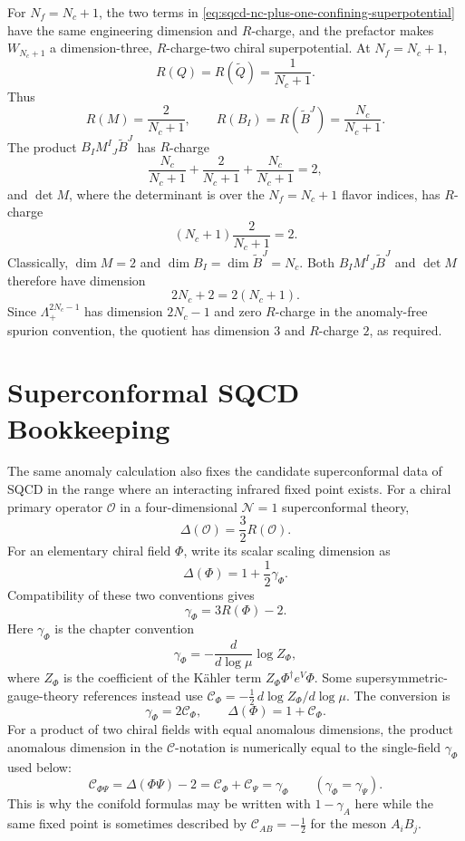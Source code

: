 \begin{remark}[Checks on the \(N_f=N_c+1\) confining superpotential]
\label{rem:sqcd-sconfining-superpotential-checks}
For \(N_f=N_c+1\), the two terms in
\eqref{eq:sqcd-nc-plus-one-confining-superpotential} have the same
engineering dimension and \(R\)-charge, and the prefactor makes
\(W_{N_c+1}\) a dimension-three, \(R\)-charge-two chiral superpotential.
At \(N_f=N_c+1\),
\[
  R(Q)=R(\widetilde Q)=\frac1{N_c+1}.
\]
Thus
\[
  R(M)=\frac2{N_c+1},\qquad
  R(B_I)=R(\widetilde B^J)=\frac{N_c}{N_c+1}.
\]
The product \(B_IM^I{}_J\widetilde B^J\) has \(R\)-charge
\[
  \frac{N_c}{N_c+1}+\frac2{N_c+1}
  +\frac{N_c}{N_c+1}
  =
  2 ,
\]
and \(\det M\), where the determinant is over the \(N_f=N_c+1\) flavor
indices, has \(R\)-charge
\[
  (N_c+1)\frac2{N_c+1}=2 .
\]
Classically, \(\dim M=2\) and \(\dim B_I=\dim\widetilde B^J=N_c\).  Both
\(B_IM^I{}_J\widetilde B^J\) and \(\det M\) therefore have dimension
\[
  2N_c+2=2(N_c+1).
\]
Since \(\Lambda_+^{2N_c-1}\) has dimension \(2N_c-1\) and zero
\(R\)-charge in the anomaly-free spurion convention, the quotient has
dimension \(3\) and \(R\)-charge \(2\), as required.
\end{remark}

\section{Superconformal SQCD Bookkeeping}
\label{sec:n1-superconformal-sqcd-bookkeeping}

The same anomaly calculation also fixes the candidate superconformal data of SQCD
in the range where an interacting infrared fixed point exists.  For a chiral
primary operator \(\mathcal O\) in a four-dimensional \(\mathcal N=1\)
superconformal theory,
\[
  \Delta(\mathcal O)=\frac32 R(\mathcal O).
\]
For an elementary chiral field \(\Phi\), write its scalar scaling dimension
as
\[
  \Delta(\Phi)=1+\frac12\gamma_\Phi .
\]
Compatibility of these two conventions gives
\begin{equation}
  \gamma_\Phi=3R(\Phi)-2 .
  \label{eq:n1-gamma-from-r}
\end{equation}
Here \(\gamma_\Phi\) is the chapter convention
\[
  \gamma_\Phi=-\frac{d}{d\log\mu}\log Z_\Phi ,
\]
where \(Z_\Phi\) is the coefficient of the Kähler term
\(Z_\Phi\Phi^\dagger e^V\Phi\).  Some supersymmetric-gauge-theory references
instead use
\(\mathcal C_\Phi=-\frac12\,d\log Z_\Phi/d\log\mu\).  The conversion is
\[
  \gamma_\Phi=2\mathcal C_\Phi,\qquad
  \Delta(\Phi)=1+\mathcal C_\Phi .
\]
For a product of two chiral fields with equal anomalous dimensions, the
product anomalous dimension in the \(\mathcal C\)-notation is numerically
equal to the single-field \(\gamma_\Phi\) used below:
\[
  \mathcal C_{\Phi\Psi}
  =
  \Delta(\Phi\Psi)-2
  =
  \mathcal C_\Phi+\mathcal C_\Psi
  =
  \gamma_\Phi
  \qquad
  (\gamma_\Phi=\gamma_\Psi).
\]
This is why the conifold formulas may be written with \(1-\gamma_A\) here
while the same fixed point is sometimes described by
\(\mathcal C_{AB}=-\frac12\) for the meson \(A_iB_j\).

